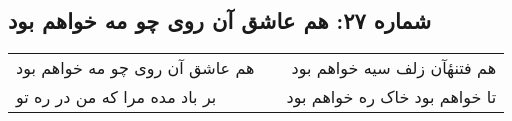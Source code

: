 \begin{center}
\section*{شماره ۲۷: هم عاشق آن روی چو مه خواهم بود}
\label{sec:027}
\begin{longtable}{l p{0.5cm} r}
هم عاشق آن روی چو مه خواهم بود
&&
هم فتنهٔآن زلف سیه خواهم بود
\\
بر باد مده مرا که من در ره تو
&&
تا خواهم بود خاک ره خواهم بود
\\
\end{longtable}
\end{center}
